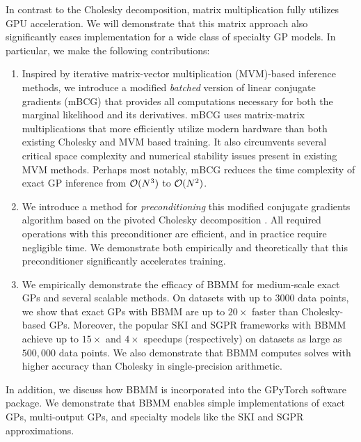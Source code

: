 In contrast to the Cholesky decomposition, matrix multiplication fully utilizes GPU acceleration.
We will demonstrate that this matrix approach also significantly eases implementation for a wide class of specialty GP models.
In particular, we make the following contributions:

\begin{enumerate}
	\item Inspired by iterative matrix-vector multiplication (MVM)-based inference methods, we introduce a modified \emph{batched} version of linear conjugate gradients (mBCG) that provides all computations necessary for both the marginal likelihood and its derivatives.
		mBCG uses matrix-matrix multiplications that more efficiently utilize modern hardware than both existing Cholesky and MVM based training.
		It also circumvents several critical space complexity and numerical stability issues present in existing MVM methods.
		Perhaps most notably, mBCG reduces the time complexity of exact GP inference from $\bigo{N^3}$ to $\bigo{N^2}$.

	\item We introduce a method for \emph{preconditioning} this modified conjugate gradients algorithm based on the pivoted Cholesky decomposition \cite{harbrecht2012low}.
		All required operations with this preconditioner are efficient, and in practice require negligible time.
		We demonstrate both empirically and theoretically that this preconditioner significantly accelerates training.

	\item We empirically demonstrate the efficacy of BBMM for medium-scale exact GPs and several scalable methods.
		On datasets with up to $3000$ data points, we show that exact GPs with BBMM are up to $20\times$ faster than Cholesky-based GPs.
		Moreover, the popular SKI \cite{wilson2015kernel} and SGPR \cite{titsias2009variational} frameworks with BBMM achieve up to $15\times$ and $4\times$ speedups (respectively) on datasets as large as $500,\!000$ data points.
		We also demonstrate that BBMM computes solves with higher accuracy than Cholesky in single-precision arithmetic.
\end{enumerate}
%
\noindent
In addition, we discuss how BBMM is incorporated into the GPyTorch software package.
We demonstrate that BBMM enables simple implementations of exact GPs, multi-output GPs, and specialty models like the SKI and SGPR approximations.


